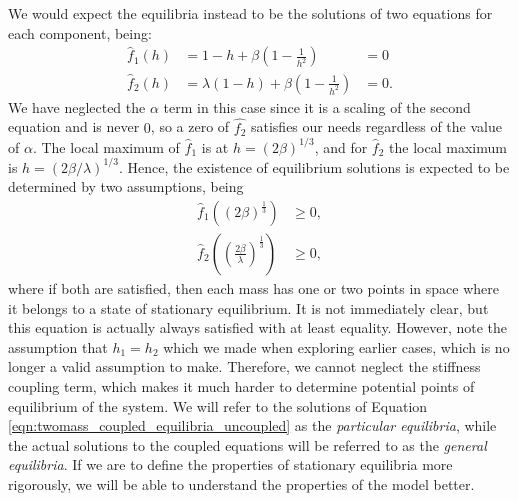 \documentclass{article}
\begin{document}
We would expect the equilibria instead to be the solutions of two equations for each component, being:
\begin{equation}
    \begin{aligned}
        \hat{f}_1(h) &= 1 - h + \beta\left( 1-\frac{1}{h^2} \right) &= 0 \\
        \hat{f}_2(h) &= \lambda(1-h) + \beta\left( 1-\frac{1}{h^2} \right) &= 0.
    \end{aligned}
    \label{eqn:twomass_coupled_equilibria_uncoupled}
\end{equation}
We have neglected the \(\alpha\) term in this case since it is a scaling of the second equation and is never $0$,
so a zero of \(\hat{f_2}\) satisfies our needs regardless of the value of \(\alpha\).
The local maximum of $\hat{f}_1$ is at $h=(2\beta)^{1/3}$,
and for $\hat{f}_2$ the local maximum is $h = (2 \beta / \lambda)^{1/3}$.
Hence, the existence of equilibrium solutions is expected to be determined by two assumptions, being
\begin{align*}
    \hat{f}_1 \left( (2\beta)^\frac{1}{3} \right) &\ge 0, \\
    \hat{f}_2 \left( \left( \frac{2\beta}{\lambda} \right)^\frac{1}{3} \right) &\ge 0,
\end{align*}
where if both are satisfied, then each mass has one or two points in space where it belongs to a state of stationary equilibrium.
It is not immediately clear, but this equation is actually always satisfied with at least equality.
However, note the assumption that \(h_1=h_2\) which we made when exploring earlier cases,
which is no longer a valid assumption to make. 
Therefore, we cannot neglect the stiffness coupling term,
which makes it much harder to determine potential points of equilibrium of the system.
We will refer to the solutions of Equation \ref{eqn:twomass_coupled_equilibria_uncoupled} as the \textit{particular equilibria},
while the actual solutions to the coupled equations will be referred to as the \textit{general equilibria}.
If we are to define the properties of stationary equilibria more rigorously,
we will be able to understand the properties of the model better.
\end{document}

